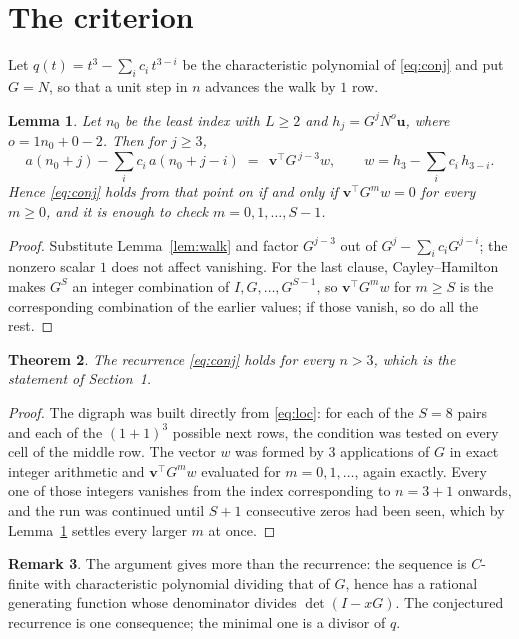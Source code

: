 \documentclass[11pt,a4paper]{article}
\theoremstyle{plain}
\newtheorem{theorem}{Theorem}
\newtheorem{lemma}[theorem]{Lemma}
\theoremstyle{definition}
\newtheorem{remark}[theorem]{Remark}
\begin{document}
\section{The criterion}

Let $q(t)=t^{3}-\sum_i c_i\,t^{3-i}$ be the characteristic polynomial of
\eqref{eq:conj} and put $G=N$, so that a unit step in $n$ advances the walk by
$1$ row.

\begin{lemma}\label{lem:crit}
Let $n_0$ be the least index with $L\ge2$ and $h_j=G^{j}N^{o}\mathbf{u}$, where
$o=1n_0+0-2$. Then for $j\ge3$,
\[
a(n_0+j)-\sum_i c_i\,a(n_0+j-i)\;=\;\,\mathbf{v}^{\!\top}G^{\,j-3}w,
\qquad w=h_{3}-\sum_i c_i\,h_{3-i} .
\]
Hence \eqref{eq:conj} holds from that point on if and only if
$\mathbf{v}^{\!\top}G^{m}w=0$ for every $m\ge0$, and it is enough to check
$m=0,1,\dots,S-1$.
\end{lemma}

\begin{proof}
Substitute Lemma~\ref{lem:walk} and factor $G^{j-3}$ out of
$G^{j}-\sum_ic_iG^{j-i}$; the nonzero scalar $1$ does not affect
vanishing. For the last clause, Cayley--Hamilton makes $G^{S}$ an integer combination of
$I,G,\dots,G^{S-1}$, so $\mathbf{v}^{\!\top}G^{m}w$ for $m\ge S$ is the corresponding
combination of the earlier values; if those vanish, so do all the rest.
\end{proof}

\begin{theorem}
The recurrence \eqref{eq:conj} holds for every $n>3$, which is the statement of
Section~1.
\end{theorem}

\begin{proof}
The digraph was built directly from \eqref{eq:loc}: for each of the $S=8$ pairs and each
of the $(1+1)^{3}$ possible next rows, the condition was tested on every cell of
the middle row. The vector $w$ was formed by $3$ applications of $G$ in exact integer
arithmetic and $\mathbf{v}^{\!\top}G^{m}w$ evaluated for $m=0,1,\dots$, again exactly.
Every one of those integers vanishes from the index corresponding to $n=3+1$ onwards,
and the run was continued until $S+1$ consecutive zeros had been seen, which by
Lemma~\ref{lem:crit} settles every larger $m$ at once.
\end{proof}

\begin{remark}
The argument gives more than the recurrence: the sequence is $C$-finite with characteristic
polynomial dividing that of $G$, hence has a rational generating function whose denominator
divides $\det(I-xG)$. The conjectured recurrence is one consequence; the minimal one is a
divisor of $q$.
\end{remark}
\end{document}
